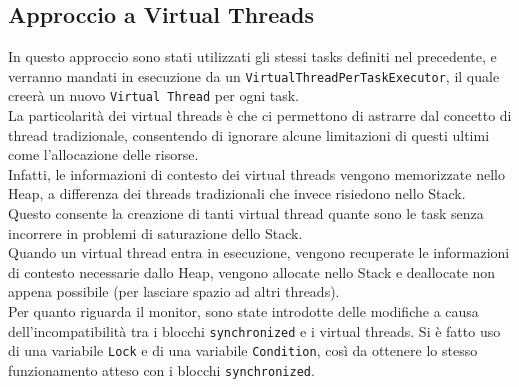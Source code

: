 \documentclass{article}
\begin{document}
    \subsection{Approccio a Virtual Threads}
    In questo approccio sono stati utilizzati gli stessi tasks definiti nel precedente, e verranno mandati in esecuzione da un \texttt{VirtualThreadPerTaskExecutor}, il quale creerà un nuovo \texttt{Virtual Thread} per ogni task.
    \\
    La particolarità dei virtual threads è che ci permettono di astrarre dal concetto di thread tradizionale, consentendo di ignorare alcune limitazioni di questi ultimi come l’allocazione delle risorse.
    \\
    Infatti, le informazioni di contesto dei virtual threads vengono memorizzate nello Heap, a differenza dei threads tradizionali che invece risiedono nello Stack.
    Questo consente la creazione di tanti virtual thread quante sono le task senza incorrere in problemi di saturazione dello Stack.
    \\
    Quando un virtual thread entra in esecuzione, vengono recuperate le informazioni di contesto necessarie dallo Heap, vengono allocate nello Stack e deallocate non appena possibile (per lasciare spazio ad altri threads).
    \\
    Per quanto riguarda il monitor, sono state introdotte delle modifiche a causa dell’incompatibilità tra i blocchi \texttt{synchronized} e i virtual threads.
    Si è fatto uso di una variabile \texttt{Lock} e di una variabile \texttt{Condition}, così da ottenere lo stesso funzionamento atteso con i blocchi \texttt{synchronized}.
\end{document}
